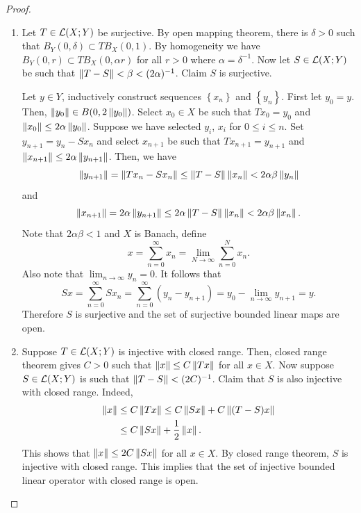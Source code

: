 \documentclass[a4paper]{article}
\begin{document}
\begin{proof}
  \begin{enumerate}
    \item Let $T \in \mathcal{L}(X; Y)$ be surjective. By open mapping theorem,
          there is $\delta > 0$ such that $B_Y(0, \delta) \subset TB_X(0,
          1)$. By homogeneity we have $B_Y(0, r) \subset TB_X(0, \alpha
          r)$ for all $r > 0$ where $\alpha = \delta^{-1}$. Now let $S \in
          \mathcal{L}(X; Y)$ be such that $\left\lVert T - S\right\rVert < \beta < (2\alpha)^{-1}$.
          Claim $S$ is surjective.

          Let $y \in Y$, inductively construct sequences $\left\{ x_n
          \right\}$ and $\left\{ y_n \right\}$. First let $y_0 = y$. Then,
          $\left\lVert y_0\right\rVert \in B(0, 2\left\lVert y_0\right\rVert)$. Select $x_0 \in X$ be such
          that $T x_0 = y_0$ and $\left\lVert x_0\right\rVert \leq 2 \alpha \left\lVert y_0\right\rVert$.
          Suppose we have selected $y_i$, $x_i$ for $0 \leq i \leq n$. Set
          $y_{n+1} = y_n - S x_n$ and select $x_{n+1}$ be such that $T
          x_{n+1} = y_{n+1}$ and $\left\lVert x_{n+1}\right\rVert \leq 2\alpha
          \left\lVert y_{n+1}\right\rVert$. Then, we have
          \[
            \left\lVert y_{n+1}\right\rVert = \left\lVert T x_n - S x_n\right\rVert \leq
            \left\lVert T - S\right\rVert \left\lVert x_n\right\rVert < 2 \alpha\beta \left\lVert y_n\right\rVert
          \]
          and
          \[
            \left\lVert x_{n+1}\right\rVert = 2 \alpha \left\lVert y_{n+1}\right\rVert \leq
            2 \alpha \left\lVert T - S\right\rVert \left\lVert x_n\right\rVert < 2 \alpha \beta \left\lVert x_n\right\rVert.
          \]
          Note that $2 \alpha\beta < 1$ and $X$ is Banach, define
          \[
            x = \sum_{n=0}^\infty x_n = \lim_{N \to \infty}
            \sum_{n = 0}^N x_n.
          \]
          Also note that $\lim_{n \to \infty} y_n = 0$. It follows that
          \[
            S x = \sum_{n=0}^\infty S x_n
            = \sum_{n=0}^\infty (y_n - y_{n+1})
            = y_0 - \lim_{n \to \infty} y_{n+1} = y.
          \]
          Therefore $S$ is surjective and the set of surjective bounded
          linear maps are open.

    \item Suppose $T \in \mathcal{L}(X; Y)$ is injective with closed range. Then,
          closed range theorem gives $C > 0$ such that $\left\lVert x\right\rVert \leq C
          \left\lVert T x\right\rVert$ for all $x \in X$. Now suppose $S \in \mathcal{L}(X; Y)$ is
          such that $\left\lVert T - S\right\rVert < (2C)^{-1}$. Claim that $S$ is also
          injective with closed range. Indeed,
          \[
            \begin{aligned}
              \left\lVert x\right\rVert & \leq C\left\lVert T x\right\rVert \leq C \left\lVert Sx\right\rVert + C \left\lVert (T-S)x\right\rVert \\
                       & \leq C \left\lVert Sx\right\rVert + \frac{1}{2}\left\lVert x\right\rVert.
            \end{aligned}
          \]
          This shows that $\left\lVert x\right\rVert \leq 2C \left\lVert Sx\right\rVert$ for all $x \in X$.
          By closed range theorem, $S$ is injective with closed range.
          This implies that the set of injective bounded linear operator
          with closed range is open.


\end{enumerate}
\end{proof}
\end{document}
